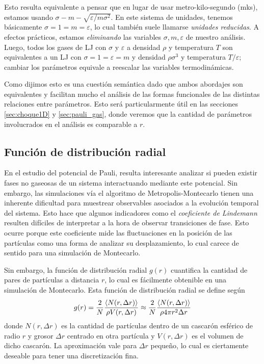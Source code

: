 Esto resulta equivalente a pensar que en lugar de usar metro-kilo-segundo (mks), estamos usando $\sigma - m - \sqrt{\varepsilon/m\sigma^2}$.
En este sistema de unidades, tenemos básicamente $\sigma=1=m=\varepsilon$, lo cual también suele llamarse \textit{unidades reducidas}.
A efectos prácticos, estamos \textit{eliminando} las variables $\sigma,m,\varepsilon$ de nuestro análisis.
Luego, todos los gases de LJ con $\sigma$ y $\varepsilon$ a densidad $\rho$ y temperatura $T$ son equivalentes a un LJ con $\sigma=1=\varepsilon=m$ y
densidad $\rho\sigma^3$ y temperatura $T/\varepsilon$; cambiar los parámetros equivale a reescalar las variables termodinámicas.

Como dijimos esto es una cuestión semántica dado que ambos abordajes son equivalentes y facilitan mucho el análisis de las formas funcionales de las distintas relaciones entre parámetros.
Esto será particularmente útil en las secciones \ref{sec:choque1D} y \ref{sec:pauli_gas}, donde veremos que la cantidad de parámetros involucrados en el análisis es comparable a $r$.


\subsection{Función de distribución radial}{\label{sec:intro_gr}}

En el estudio del potencial de Pauli, resulta interesante analizar si pueden existir fases no gaseosas de un sistema interactuando mediante este potencial.
Sin embargo, las simulaciones vía el algoritmo de Metropolis-Montecarlo tienen una inherente dificultad para muestrear observables asociados a la evolución temporal del sistema.
Esto hace que algunos indicadores como el \textit{coeficiente de Lindemann} resulten difíciles de interpretar a la hora de observar transiciones de fase.
Esto ocurre porque este coeficiente mide las fluctuaciones en la posición de las partículas como una forma de analizar su desplazamiento, lo cual carece de sentido para una simulación de Montecarlo.

Sin embargo, la función de distribución radial $g(r)$ cuantifica la cantidad de pares de partículas a distancia $r$, lo cual es fácilmente obtenible en una simulación de Montecarlo.
Esta función de distribución radial se define según 
\begin{equation}{\label{eq:def_gr}}
 g(r) = \frac{2}{N}\frac{\left< N(r,\Delta r) \right>}{\rho V(r,\Delta r)} \approx \frac{2}{N}\frac{\left< N(r,\Delta r) \right>}{\rho 4\pi  r^2\Delta r}
\end{equation}
donde $N(r,\Delta r)$ es la cantidad de partículas dentro de un cascarón esférico de radio $r$ y grosor $\Delta r$ centrado en otra partícula y $V(r,\Delta r)$ es el volumen de dicho cascarón\cite{BOOK:HAILE}.
La aproximación vale para $\Delta r$ pequeño, lo cual es ciertamente deseable para tener una discretización fina.

